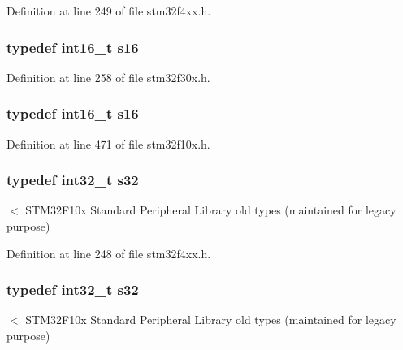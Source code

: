 Definition at line 249 of file stm32f4xx.\-h.

\hypertarget{group___exported__types_gaa980e2c02ba2305e0f489d5650655425}{
\subsubsection[{s16}]{\setlength{\rightskip}{0pt plus 5cm}typedef {\bf int16\-\_\-t} {\bf s16}}}\label{group___exported__types_gaa980e2c02ba2305e0f489d5650655425}


Definition at line 258 of file stm32f30x.\-h.

\hypertarget{group___exported__types_gaa980e2c02ba2305e0f489d5650655425}{
\subsubsection[{s16}]{\setlength{\rightskip}{0pt plus 5cm}typedef {\bf int16\-\_\-t} {\bf s16}}}\label{group___exported__types_gaa980e2c02ba2305e0f489d5650655425}


Definition at line 471 of file stm32f10x.\-h.

\hypertarget{group___exported__types_gae9b1af5c037e57a98884758875d3a7c4}{
\subsubsection[{s32}]{\setlength{\rightskip}{0pt plus 5cm}typedef {\bf int32\-\_\-t} {\bf s32}}}\label{group___exported__types_gae9b1af5c037e57a98884758875d3a7c4}
$<$ S\-T\-M32\-F10x Standard Peripheral Library old types (maintained for legacy purpose) 

Definition at line 248 of file stm32f4xx.\-h.

\hypertarget{group___exported__types_gae9b1af5c037e57a98884758875d3a7c4}{
\subsubsection[{s32}]{\setlength{\rightskip}{0pt plus 5cm}typedef {\bf int32\-\_\-t} {\bf s32}}}\label{group___exported__types_gae9b1af5c037e57a98884758875d3a7c4}
$<$ S\-T\-M32\-F10x Standard Peripheral Library old types (maintained for legacy purpose) 

